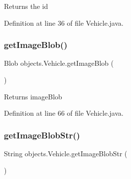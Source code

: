 \begin{DoxyReturn}{Returns}
the id 
\end{DoxyReturn}


Definition at line 36 of file Vehicle.\+java.


\begin{DoxyCode}{0}

\end{DoxyCode}
\mbox{\label{classobjects_1_1_vehicle_a65b401d64cb83b83daf83c33919816c5}} 
\subsubsection{\texorpdfstring{getImageBlob()}{getImageBlob()}}
{\footnotesize\ttfamily Blob objects.\+Vehicle.\+get\+Image\+Blob (\begin{DoxyParamCaption}{ }\end{DoxyParamCaption})}

\begin{DoxyReturn}{Returns}
image\+Blob 
\end{DoxyReturn}


Definition at line 66 of file Vehicle.\+java.


\begin{DoxyCode}{0}

\end{DoxyCode}
\mbox{\label{classobjects_1_1_vehicle_af39b2e7837b4bac8dc55002dc1045e75}} 
\subsubsection{\texorpdfstring{getImageBlobStr()}{getImageBlobStr()}}
{\footnotesize\ttfamily String objects.\+Vehicle.\+get\+Image\+Blob\+Str (\begin{DoxyParamCaption}{ }\end{DoxyParamCaption})}

